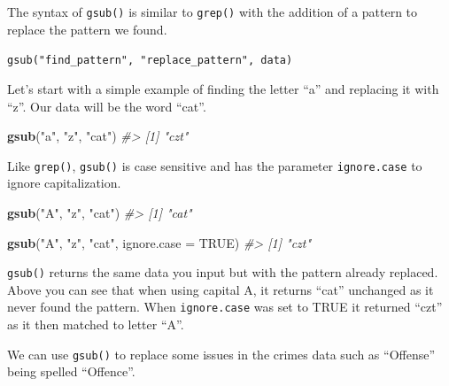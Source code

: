 \documentclass[
  12pt,
]{book}
\newenvironment{Shaded}{\begin{snugshade}}{\end{snugshade}}
\newcommand{\CommentTok}[1]{\textcolor[rgb]{0.37,0.37,0.37}{\textit{#1}}}
\newcommand{\DataTypeTok}[1]{\textcolor[rgb]{0.27,0.27,0.27}{#1}}
\newcommand{\KeywordTok}[1]{\textcolor[rgb]{0.27,0.27,0.27}{\textbf{#1}}}
\newcommand{\NormalTok}[1]{#1}
\newcommand{\OtherTok}[1]{\textcolor[rgb]{0.37,0.37,0.37}{#1}}
\newcommand{\StringTok}[1]{\textcolor[rgb]{0.5,0.5,0.5}{#1}}
\begin{document}
The syntax of \texttt{gsub()} is similar to \texttt{grep()} with the addition of a pattern to replace the pattern we found.

\texttt{gsub("find\_pattern",\ "replace\_pattern",\ data)}

Let's start with a simple example of finding the letter ``a'' and replacing it with ``z''. Our data will be the word ``cat''.

\begin{Shaded}
\begin{Highlighting}[]
\KeywordTok{gsub}\NormalTok{(}\StringTok{"a"}\NormalTok{, }\StringTok{"z"}\NormalTok{, }\StringTok{"cat"}\NormalTok{)}
\CommentTok{\#> [1] "czt"}
\end{Highlighting}
\end{Shaded}

Like \texttt{grep()}, \texttt{gsub()} is case sensitive and has the parameter \texttt{ignore.case} to ignore capitalization.

\begin{Shaded}
\begin{Highlighting}[]
\KeywordTok{gsub}\NormalTok{(}\StringTok{"A"}\NormalTok{, }\StringTok{"z"}\NormalTok{, }\StringTok{"cat"}\NormalTok{)}
\CommentTok{\#> [1] "cat"}
\end{Highlighting}
\end{Shaded}

\begin{Shaded}
\begin{Highlighting}[]
\KeywordTok{gsub}\NormalTok{(}\StringTok{"A"}\NormalTok{, }\StringTok{"z"}\NormalTok{, }\StringTok{"cat"}\NormalTok{, }\DataTypeTok{ignore.case =} \OtherTok{TRUE}\NormalTok{)}
\CommentTok{\#> [1] "czt"}
\end{Highlighting}
\end{Shaded}

\texttt{gsub()} returns the same data you input but with the pattern already replaced. Above you can see that when using capital A, it returns ``cat'' unchanged as it never found the pattern. When \texttt{ignore.case} was set to TRUE it returned ``czt'' as it then matched to letter ``A''.

We can use \texttt{gsub()} to replace some issues in the crimes data such as ``Offense'' being spelled ``Offence''.
\end{document}
